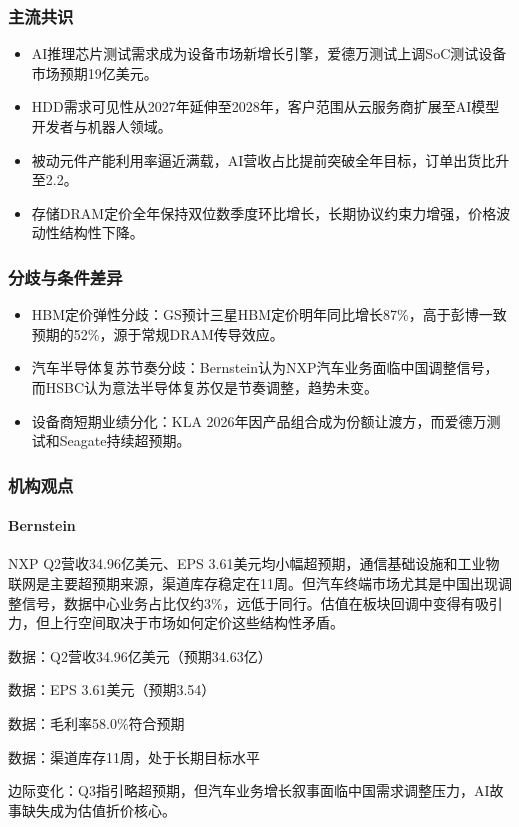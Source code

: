 \documentclass[11pt]{ctexart}
\begin{document}
\subsubsection*{主流共识}
\begin{itemize}
  \item AI推理芯片测试需求成为设备市场新增长引擎，爱德万测试上调SoC测试设备市场预期19亿美元。
  \item HDD需求可见性从2027年延伸至2028年，客户范围从云服务商扩展至AI模型开发者与机器人领域。
  \item 被动元件产能利用率逼近满载，AI营收占比提前突破全年目标，订单出货比升至2.2。
  \item 存储DRAM定价全年保持双位数季度环比增长，长期协议约束力增强，价格波动性结构性下降。
\end{itemize}
\subsubsection*{分歧与条件差异}
\begin{itemize}
  \item HBM定价弹性分歧：GS预计三星HBM定价明年同比增长87\%，高于彭博一致预期的52\%，源于常规DRAM传导效应。
  \item 汽车半导体复苏节奏分歧：Bernstein认为NXP汽车业务面临中国调整信号，而HSBC认为意法半导体复苏仅是节奏调整，趋势未变。
  \item 设备商短期业绩分化：KLA 2026年因产品组合成为份额让渡方，而爱德万测试和Seagate持续超预期。
\end{itemize}
\subsubsection*{机构观点}
\paragraph{Bernstein} NXP Q2营收34.96亿美元、EPS 3.61美元均小幅超预期，通信基础设施和工业物联网是主要超预期来源，渠道库存稳定在11周。但汽车终端市场尤其是中国出现调整信号，数据中心业务占比仅约3\%，远低于同行。估值在板块回调中变得有吸引力，但上行空间取决于市场如何定价这些结构性矛盾。
{\small\color{refgray}数据：Q2营收34.96亿美元（预期34.63亿）\par}
{\small\color{refgray}数据：EPS 3.61美元（预期3.54）\par}
{\small\color{refgray}数据：毛利率58.0\%符合预期\par}
{\small\color{refgray}数据：渠道库存11周，处于长期目标水平\par}
{\small\color{refgray}边际变化：Q3指引略超预期，但汽车业务增长叙事面临中国需求调整压力，AI故事缺失成为估值折价核心。\par}
\end{document}
